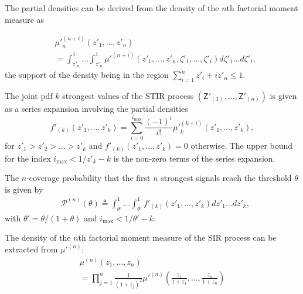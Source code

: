 \documentclass[lettersize,journal]{IEEEtran}
\begin{document}
The partial densities can be derived from the density of the $n$th factorial moment measure as

\begin{align}
  \label{eq:auxillary}
  &{\mu'}_n^{(n+i)}(z'_1,\dots,z'_n) \nonumber \\
  &= \int_{z'_n}^1 \dots \int_{z'_n}^1 {\mu'}^{(n+i)}(z'_1,\dots,z'_n,\zeta'_1,\dots,\zeta'_i) d\zeta'_1 \dots d\zeta'_i,
\end{align}
the support of the density being in the region $\sum_{i=1}^nz'_i+iz'_n \leq 1$. 


The joint pdf $k$ strongest values of the STIR process $(\mathsf{Z}'_{(1)}, \dots, \mathsf{Z}'_{(n)})$ is given as a series expansion involving the partial densities
\begin{equation}
  \label{eq:jointprobability}
  f'_{(k)}(z'_1,\dots,z'_k)= \sum^{i_{\text{max}}}_{i=0}\frac{(-1)^i}{i!}{\mu'}_k^{(k+i)}(z'_1,\dots,z'_k),
\end{equation}
for $z'_1>z'_2>\dots>z'_k$ and $f'_{(k)}(z'_1,\dots,z'_k) =0 $ otherwise. The upper bound for the index $i_{\text{max}}<1/z'_k-k$ is the non-zero terms of the series expansion. 

The $n$-coverage probability that the first $n$ strongest signals reach the threshold $\theta$ is given by
\begin{align}
  \label{eq:kprobability}
  &\mathcal{P}^{(n)}(\theta) \triangleq  \int_{\theta'}^1\dots \int_{\theta'}^1 f'_{(k)}({z'_1},\dots,{z'_k})dz'_1 \dots d{z'_k}, 
\end{align}
with $\theta'=\theta/(1+\theta)$ and $i_{\text{max}}<1/\theta'-k$.





    The density of the $n$th factorial moment measure of the SIR process can be extracted from $\mu'^{(n)}$:
    \begin{align}
      \label{eq:densitySINR}
      &\mu^{(n)}(z_1,\dots,z_n)&  \nonumber\\
      &= \prod_{j=1}^n\frac{1}{(1+z_j)^2}\mu'^{(n)}\left(\frac{z_1}{1+z_1},\dots,\frac{z_n}{1+z_n}\right)
    \end{align}
\end{document}
